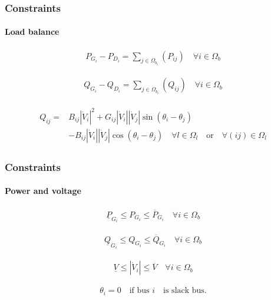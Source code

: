 \documentclass[
	11pt, %
	aspectratio=169, %
]{beamer}
\begin{document}
\begin{frame}
	\frametitle{Constraints}
	\framesubtitle{Load balance} %

	\begin{align}
		P_{G_{i}} - P_{D_{i}} = \sum_{j \in \Omega_{b_{i}}}(P_{ij})  \quad \forall i \in \Omega_{b}
	\end{align}

	\begin{align}
		Q_{G_{i}} - Q_{D_{i}} = \sum_{j \in \Omega_{b_{i}}}(Q_{ij})  \quad \forall i \in \Omega_{b}
	\end{align}

	\begin{align}
		\begin{split}
			Q_{ij}=&B_{ij}\left\lvert \dot{V}_{i}\right\rvert^{2} + G_{ij}\left\lvert \dot{V}_{i}\right\rvert\left\lvert \dot{V}_{j}\right\rvert \sin{\left(\theta_{i}-\theta_{j}\right)} \\
			&- B_{ij}\left\lvert \dot{V}_{i}\right\rvert\left\lvert \dot{V}_{j}\right\rvert \cos{\left(\theta_{i}-\theta_{j}\right)}  \quad   \forall l \in \Omega_{l} \quad \text{or} \quad \forall (ij) \in \Omega_{l}
		\end{split}
	\end{align}

	
\end{frame}


\begin{frame}
	\frametitle{Constraints}
	\framesubtitle{Power and voltage} %

	\begin{align}
		\underline{P}_{G_{i}} \leq P_{G_{i}} \leq \overline{P}_{G_{i}}  \quad \forall i \in \Omega_{b}
	\end{align}

	\begin{align}
		\underline{Q}_{G_{i}} \leq Q_{G_{i}} \leq \overline{Q}_{G_{i}}  \quad \forall i \in \Omega_{b}
	\end{align}

	\begin{align}
		\underline{V} \leq \left|\dot{V}_{i} \right| \leq \overline{V}  \quad \forall i \in \Omega_{b}
	\end{align}

	\begin{align}
		\theta_{i} = 0  \quad \text{if bus } i \quad \text{is slack bus.}
	\end{align}

	
\end{frame}
\end{document}
